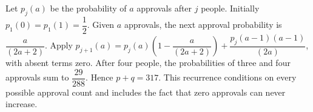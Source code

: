 Let $p_j(a)$ be the probability of $a$ approvals after $j$ people. Initially $p_1(0)=p_1(1)=\dfrac{1}{2}$. Given $a$ approvals, the next approval probability is $\dfrac{a}{(2a+2)}$. Apply $p_{j+1}(a)=p_j(a)(1-\dfrac{a}{(2a+2)})+\dfrac{p_j(a-1)(a-1)}{(2a)}$, with absent terms zero. After four people, the probabilities of three and four approvals sum to $\dfrac{29}{288}$. Hence $p+q=\boxed{317}$. This recurrence conditions on every possible approval count and includes the fact that zero approvals can never increase.
